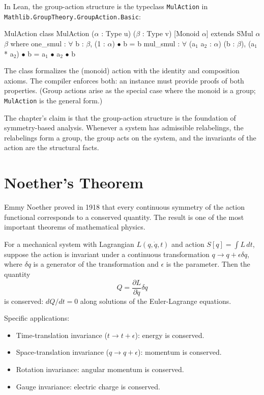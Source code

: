 In Lean, the group-action structure is the typeclass
\texttt{MulAction} in \texttt{Mathlib.GroupTheory.GroupAction.Basic}:

\begin{leanexcerpt}{MulAction}
class MulAction ($\alpha$ : Type u) ($\beta$ : Type v) [Monoid $\alpha$]
    extends SMul $\alpha$ $\beta$ where
  one_smul : $\forall$ b : $\beta$, (1 : $\alpha$) $\bullet$ b = b
  mul_smul : $\forall$ (a$_1$ a$_2$ : $\alpha$) (b : $\beta$),
    (a$_1$ * a$_2$) $\bullet$ b = a$_1$ $\bullet$ a$_2$ $\bullet$ b
\end{leanexcerpt}

The class formalizes the (monoid) action with the identity and
composition axioms. The compiler enforces both: an instance must
provide proofs of both properties. (Group actions arise as the
special case where the monoid is a group; \texttt{MulAction} is
the general form.)

The chapter's claim is that the group-action structure is the
foundation of symmetry-based analysis. Whenever a system has
admissible relabelings, the relabelings form a group, the group
acts on the system, and the invariants of the action are the
structural facts.

\section{Noether's Theorem}
\label{se:noethers-theorem}

Emmy Noether proved in 1918 that every continuous symmetry of the
action functional corresponds to a conserved quantity. The result
is one of the most important theorems of mathematical physics.

For a mechanical system with Lagrangian $L(q, \dot{q}, t)$ and
action $S[q] = \int L \, dt$, suppose the action is invariant under
a continuous transformation $q \to q + \epsilon \delta q$, where
$\delta q$ is a generator of the transformation and $\epsilon$ is
the parameter. Then the quantity
\[
Q = \frac{\partial L}{\partial \dot{q}} \delta q
\]
is conserved: $dQ/dt = 0$ along solutions of the Euler-Lagrange
equations.

Specific applications:
\begin{itemize}
\item Time-translation invariance ($t \to t + \epsilon$): energy is
conserved.
\item Space-translation invariance ($q \to q + \epsilon$): momentum
is conserved.
\item Rotation invariance: angular momentum is conserved.
\item Gauge invariance: electric charge is conserved.
\end{itemize}


